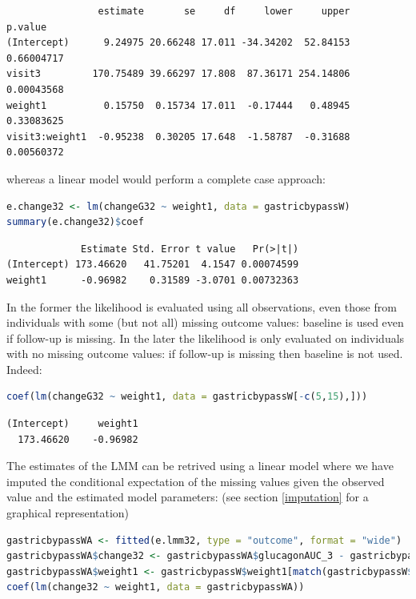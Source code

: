 \documentclass[12pt]{article}
\begin{document}
\label{}
\begin{verbatim}
                estimate       se     df     lower     upper    p.value
(Intercept)      9.24975 20.66248 17.011 -34.34202  52.84153 0.66004717
visit3         170.75489 39.66297 17.808  87.36171 254.14806 0.00043568
weight1          0.15750  0.15734 17.011  -0.17444   0.48945 0.33083625
visit3:weight1  -0.95238  0.30205 17.648  -1.58787  -0.31688 0.00560372
\end{verbatim}


whereas a linear model would perform a complete case approach:
\begin{lstlisting}[language=r,numbers=none]
e.change32 <- lm(changeG32 ~ weight1, data = gastricbypassW)
summary(e.change32)$coef
\end{lstlisting}

\label{}
\begin{verbatim}
             Estimate Std. Error t value   Pr(>|t|)
(Intercept) 173.46620   41.75201  4.1547 0.00074599
weight1      -0.96982    0.31589 -3.0701 0.00732363
\end{verbatim}


In the former the likelihood is evaluated using all observations, even
those from individuals with some (but not all) missing outcome values:
baseline is used even if follow-up is missing. In the later the
likelihood is only evaluated on individuals with no missing outcome
values: if follow-up is missing then baseline is not used. Indeed:
\begin{lstlisting}[language=r,numbers=none]
coef(lm(changeG32 ~ weight1, data = gastricbypassW[-c(5,15),]))
\end{lstlisting}

\label{}
\begin{verbatim}
(Intercept)     weight1 
  173.46620    -0.96982
\end{verbatim}


The estimates of the LMM can be retrived using a linear model where we
have imputed the conditional expectation of the missing values given
the observed value and the estimated model parameters: (see section
\ref{imputation} for a graphical representation)
\begin{lstlisting}[language=r,numbers=none]
gastricbypassWA <- fitted(e.lmm32, type = "outcome", format = "wide")
gastricbypassWA$change32 <- gastricbypassWA$glucagonAUC_3 - gastricbypassWA$glucagonAUC_2
gastricbypassWA$weight1 <- gastricbypassW$weight1[match(gastricbypassW$id,gastricbypassWA$id)]
coef(lm(change32 ~ weight1, data = gastricbypassWA))
\end{lstlisting}
\end{document}

